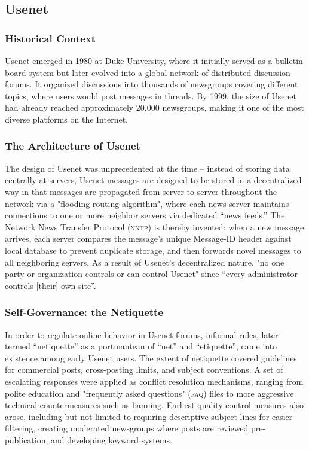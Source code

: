 \subsection{Usenet}
\subsubsection{Historical Context\cite{HowUseUsenet}}
Usenet emerged in 1980 at Duke University, where it initially served as a
bulletin board system but later evolved into a global network of distributed
discussion forums. It organized discussions into thousands of newsgroups
covering different topics, where users would post messages in threads. By 1999,
the size of Usenet had already reached approximately 20,000 newsgroups, making
it one of the most diverse platforms on the Internet.

\subsubsection{The Architecture of Usenet\cite{HowUseUsenet}}
The design of Usenet was unprecedented at the time -- instead of storing data
centrally at servers, Usenet messages are designed to be stored in a
decentralized way in that messages are propagated from server to server
throughout the network via a "flooding routing algorithm", where each news
server maintains connections to one or more neighbor servers via dedicated
``news feeds.'' The Network News Transfer Protocol (\textsc{nntp}) is thereby
invented: when a new message arrives, each server compares the message's unique
Message-ID header against local database to prevent duplicate storage, and then
forwards novel messages to all neighboring servers. As a result of Usenet's
decentralized nature, "no one party or organization controls or can control
Usenet" since ``every administrator controls [their] own site''.

\subsubsection{Self-Governance: the Netiquette\cite{HowUseUsenet}}

In order to regulate online behavior in Usenet forums, informal rules, later
termed ``netiquette'' as a portmanteau of ``net'' and ``etiquette'', came into
existence among early Usenet users. The extent of netiquette covered guidelines
for commercial posts, cross-posting limits, and subject conventions. A set of
escalating responses were applied as conflict resolution mechanisms, ranging
from polite education and "frequently asked questions" (\textsc{faq}) files to
more aggressive technical countermeasures such as banning. Earliest quality
control measures also arose, including but not limited to requiring descriptive
subject lines for easier filtering, creating moderated newsgroups where posts
are reviewed pre-publication, and developing keyword systems.

